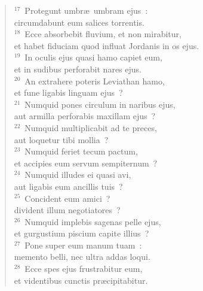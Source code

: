 \begin{flushleft}
\begin{verse}
${}^{17}$~Protegunt umbr\ae\ umbram ejus~:\\ circumdabunt eum salices torrentis.\\
${}^{18}$~Ecce absorbebit fluvium, et non mirabitur,\\ et habet fiduciam quod influat Jordanis in os ejus.\\
${}^{19}$~In oculis ejus quasi hamo capiet eum,\\ et in sudibus perforabit nares ejus.\\
${}^{20}$~An extrahere poteris Leviathan hamo,\\ et fune ligabis linguam ejus~?\\
${}^{21}$~Numquid pones circulum in naribus ejus,\\ aut armilla perforabis maxillam ejus~?\\
${}^{22}$~Numquid multiplicabit ad te preces,\\ aut loquetur tibi mollia~?\\
${}^{23}$~Numquid feriet tecum pactum,\\ et accipies eum servum sempiternum~?\\
${}^{24}$~Numquid illudes ei quasi avi,\\ aut ligabis eum ancillis tuis~?\\
${}^{25}$~Concident eum amici~?\\ divident illum negotiatores~?\\
${}^{26}$~Numquid implebis sagenas pelle ejus,\\ et gurgustium piscium capite illius~?\\
${}^{27}$~Pone super eum manum tuam~:\\ memento belli, nec ultra addas loqui.\\
${}^{28}$~Ecce spes ejus frustrabitur eum,\\ et videntibus cunctis pr\ae cipitabitur.\end{verse}\end{flushleft}


